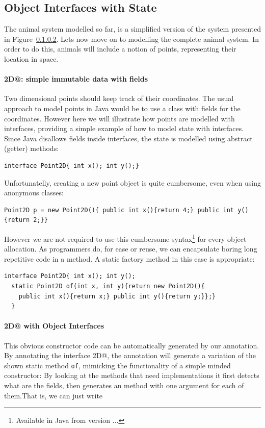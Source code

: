 \subsection{Object Interfaces with State}

The animal system modelled so far, is a simplified version of the
system presented in Figure~\ref{}.  Lets now move on to modelling 
the complete animal system. In order to do this, animals will include 
a notion of points, representing their location in space. 

\paragraph{\Q@Point2D@: simple immutable data with fields}
Two dimensional points should keep track of their coordinates. 
The usual approach to model points in Java would be to use a class 
with fields for the coordinates. However here we will illustrate how 
points are modelled with interfaces, providing a simple 
example of how to model state with interfaces. Since Java disallows fields 
inside interfaces, the state is modelled using abstract (getter) methods:

\begin{lstlisting}
interface Point2D{ int x(); int y();}
\end{lstlisting}

\noindent Unfortunatelly, creating a new point object is quite cumbersome, even 
when using anonymous classes: 

\begin{lstlisting}
Point2D p = new Point2D(){ public int x(){return 4;} public int y(){return 2;}}
\end{lstlisting}

However we are not required to use this cumbersome
syntax\footnote{Available in Java from version ...} for every object
allocation.  As programmers do, for ease or reuse, we can encapsulate
boring long repetitive code in a method. A static factory method in
this case is appropriate:
\begin{lstlisting}
interface Point2D{ int x(); int y();
  static Point2D of(int x, int y){return new Point2D(){
    public int x(){return x;} public int y(){return y;}};}
  }
\end{lstlisting}

\paragraph{\Q@Point2D@ with Object Interfaces}
This obvious constructor code can be automatically generated by our
\mixin annotation.  By annotating the interface \Q@Point2D@, the
annotation will generate a variation of the shown static method
\texttt{of}, mimicking the functionality of a simple minded
constructor: By looking at the methods that need implementations it
first detects what are the fields, then generates an \Q@of@ method with
one argument for each of them.That is, we can just write

